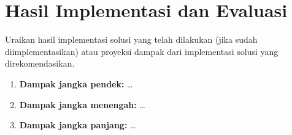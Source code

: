 \section{Hasil Implementasi dan Evaluasi}
\label{sec:hasil-evaluasi}

Uraikan hasil implementasi solusi yang telah dilakukan (jika sudah diimplementasikan)
atau proyeksi dampak dari implementasi solusi yang direkomendasikan.

\begin{enumerate}
  \item \textbf{Dampak jangka pendek:} \ldots
  \item \textbf{Dampak jangka menengah:} \ldots
  \item \textbf{Dampak jangka panjang:} \ldots
\end{enumerate}
